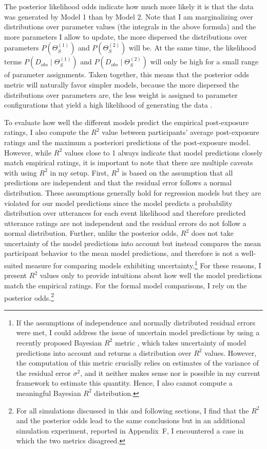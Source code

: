 \noindent The posterior likelihood odds indicate how much more likely it is that the data was generated by Model 1 than by Model 2. Note that I am marginalizing over distributions over parameter values (the integrals in the above formula) and the more parameters I allow to update, the more dispersed the distributions over parameters  $P\left(\Theta_{S}^{(1)}\right)$ and $P\left(\Theta_{S}^{(2)}\right)$ will be. At the same time, the likelihood terms $P\left(D_{obs} \mid \Theta_{S}^{(1)}\right)$ and $P\left(D_{obs} \mid \Theta_{S}^{(2)}\right)$ will only be high for a small range of parameter assignments. Taken together, this means that the posterior odds metric will naturally favor simpler models, because the more dispersed the distributions over parameters are, the less weight is assigned to parameter configurations that yield a high likelihood of generating the data \parencite[a property often referred to as Bayesian Occam's razor; see, e.g.,][]{MacKay1992,Neal1995}. 

To evaluate how well the different models predict the empirical post-exposure ratings, I also compute the $R^2$ value between participants' average 
post-exposure ratings and the maximum a posteriori predictions of the post-exposure model. However, while $R^2$ values close to 1 always indicate 
that model predictions closely match empirical ratings, it is important to note that there are multiple caveats with using $R^2$ in my setup. 
First, $R^2$ is based on the assumption that all predictions are independent and that the residual error follows a normal distribution. 
These assumptions generally hold for regression models but they are violated for our model predictions since the model predicts a 
probability distribution over utterances for each event likelihood and therefore predicted utterance ratings are not independent and the 
residual errors do not follow a normal distribution. Further, unlike the posterior odds,
$R^2$ does not take uncertainty of the model predictions into account but instead compares the mean participant behavior to the mean 
model predictions, and therefore is not a well-suited measure for comparing models exhibiting uncertainty.\footnote{If the assumptions of independence and normally distributed 
residual errors were met, I could address the issue of uncertain model predictions by using a recently proposed Bayesian $R^2$ metric \cite{Gelman2019}, 
which takes uncertainty of model predictions into account and returns a distribution over $R^2$ values. 
However, the computation of this metric crucially relies on estimates of the variance of the residual error $\sigma^2$, and it neither 
makes sense nor is possible in my current framework to estimate this quantity. Hence, I also cannot compute a meaningful Bayesian $R^2$ distribution.} 
For these reasons, I present $R^2$ values only to provide intuitions about how well the model predictions match the empirical ratings. For the formal model comparisons, I 
rely on the posterior odds.\footnote{For all simulations discussed in this and following sections, I find that the $R^2$ and the posterior odds lead to the same conclusions but in an additional simulation experiment, reported in Appendix~F, I encountered a case in which the two metrics disagreed.} 


